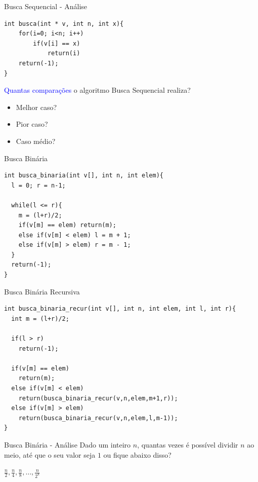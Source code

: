 \documentclass{beamer}
\newcommand{\tcb}[1]{\textcolor{blue}{#1}}
\begin{document}
	\begin{frame}[fragile]{Busca Sequencial - Análise}

		\begin{verbatim}
int busca(int * v, int n, int x){
	for(i=0; i<n; i++)
		if(v[i] == x)
			return(i)
	return(-1);
}
		\end{verbatim}
		 \tcb{Quantas comparações} o algoritmo Busca Sequencial realiza?
		\begin{itemize}
			\item<3->{Melhor caso? \only<4->{$= 1$}}
			\item<3->{Pior caso? \only<5->{$\displaystyle = \sum_{i=0}^{n}{1} = n$}}
			\item<3->{Caso médio? \only<6->{$\displaystyle = \frac{n}{2}$}}
		\end{itemize}
	\end{frame}

	\begin{frame}[fragile]{Busca Binária}
		\begin{verbatim}
int busca_binaria(int v[], int n, int elem){
  l = 0; r = n-1;

  while(l <= r){
    m = (l+r)/2;
    if(v[m] == elem) return(m);
    else if(v[m] < elem) l = m + 1;
    else if(v[m] > elem) r = m - 1;
  }
  return(-1);
}
		\end{verbatim}
	\end{frame}

	\begin{frame}[fragile]{Busca Binária Recursiva}
		\begin{verbatim}
int busca_binaria_recur(int v[], int n, int elem, int l, int r){
  int m = (l+r)/2;

  if(l > r)
    return(-1);

  if(v[m] == elem)
    return(m);
  else if(v[m] < elem)
    return(busca_binaria_recur(v,n,elem,m+1,r));
  else if(v[m] > elem)
    return(busca_binaria_recur(v,n,elem,l,m-1));
}
		\end{verbatim}
	\end{frame}

	\begin{frame}{Busca Binária - Análise}
		Dado um inteiro $n$, quantas vezes é possível dividir $n$
		ao meio, até que o seu valor seja $1$ ou fique abaixo disso?

		\center $\displaystyle \frac{n}{2},\frac{n}{4},\frac{n}{8},\ldots,\frac{n}{2^k}$

	\end{frame}
	
\end{document}
